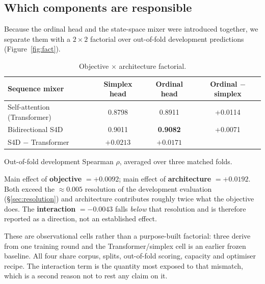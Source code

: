 \documentclass[11pt]{article}
\newcommand{\rhoS}{\rho}
\begin{document}
\subsection{Which components are responsible}

Because the ordinal head and the state-space mixer were introduced together, we
separate them with a $2\times2$ factorial over out-of-fold development predictions
(Figure~\ref{fig:fact}).

\begin{table}[H]
\centering
\begin{threeparttable}
\caption{Objective $\times$ architecture factorial.}
\label{tab:factorial}
\begin{tabular}{l S[table-format=1.4] S[table-format=1.4] S[table-format=+1.4]}
\toprule
Sequence mixer & {Simplex head} & {Ordinal head} & {Ordinal $-$ simplex} \\
\midrule
Self-attention (Transformer) & 0.8798 & 0.8911 & +0.0114 \\
Bidirectional S4D            & 0.9011 & \bfseries 0.9082 & +0.0071 \\
\midrule
S4D $-$ Transformer & {$+0.0213$} & {$+0.0171$} & \\
\bottomrule
\end{tabular}
\begin{tablenotes}[flushleft]\footnotesize
\item Out-of-fold development Spearman $\rhoS$, averaged over three matched folds.
\item Main effect of \textbf{objective} $=+0.0092$; main effect of
\textbf{architecture} $=+0.0192$. Both exceed the $\approx0.005$ resolution of the
development evaluation (\S\ref{sec:resolution}) and architecture contributes roughly
twice what the objective does. The \textbf{interaction} $=-0.0043$ falls \emph{below}
that resolution and is therefore reported as a direction, not an established effect.
\item These are observational cells rather than a purpose-built factorial: three
derive from one training round and the Transformer/simplex cell is an earlier frozen
baseline. All four share corpus, splits, out-of-fold scoring, capacity and optimiser
recipe. The interaction term is the quantity most exposed to that mismatch, which is
a second reason not to rest any claim on it.
\end{tablenotes}
\end{threeparttable}
\end{table}
\end{document}
